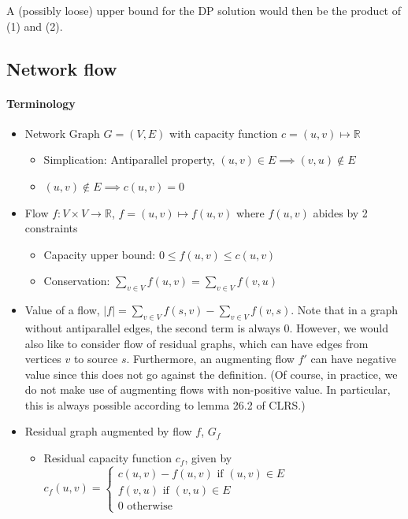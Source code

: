 \documentclass{article}
\begin{document}
A (possibly loose) upper bound for the DP solution would then be the product of (1) and (2).

\subsection{Network flow}
\paragraph{Terminology}
\begin{itemize}
	\item Network Graph $G=(V,E)$ with capacity function $c=(u,v)\mapsto \mathbb{R}$
	\begin{itemize}
		\item Simplication: Antiparallel property, $(u,v)\in E\implies (v,u)\notin E$
		\item $(u,v)\notin E\implies c(u,v) = 0$
	\end{itemize}
	\item Flow $f:V\times V\rightarrow \mathbb{R}$, $f=(u,v)\mapsto f(u,v)$ where $f(u,v)$ abides by 2 constraints
	\begin{itemize}
		\item Capacity upper bound: $0\leq f(u,v)\leq c(u,v)$
		\item Conservation: $\sum_{v\in V}f(u,v) = \sum_{v\in V}f(v,u)$
	\end{itemize}
	\item Value of a flow, $|f|=\sum_{v\in V}f(s,v)-\sum_{v\in V}f(v,s)$. Note that in a graph without antiparallel edges, the second term is always $0$. However, we would also like to consider flow of residual graphs, which can have edges from vertices $v$ to source $s$. Furthermore, an augmenting flow $f'$ can have negative value since this does not go against the definition. (Of course, in practice, we do not make use of augmenting flows with non-positive value. In particular, this is always possible according to lemma 26.2 of CLRS.)
	\item Residual graph augmented by flow $f$, $G_f$
	\begin{itemize}
		\item Residual capacity function $c_f$, given by
		$c_f(u,v)=\begin{cases}c(u,v) - f(u,v) \text{ if } (u,v)\in E\\ f(v,u)\text{ if } (v,u)\in E\\ 0 \text{ otherwise} \end{cases}$\\

\end{itemize}
\end{itemize}
\end{document}
